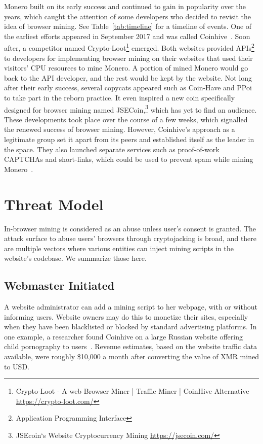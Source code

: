 Monero built on its early success and continued to gain in popularity over the years, which caught the attention of some developers who decided to revisit the idea of browser mining. See Table~\ref{tab:timeline} for a timeline of events.  One of the earliest efforts appeared in September 2017 and was called Coinhive~\cite{coinhive}. Soon after, a competitor named Crypto-Loot\footnote{Crypto-Loot - A web Browser Miner | Traffic Miner | CoinHive Alternative \url{https://crypto-loot.com/}} emerged. Both websites provided APIs\footnote{Application Programming Interface} to developers for implementing browser mining on their websites that used their visitors' CPU resources to mine Monero. A portion of mined Monero would go back to the API developer, and the rest would be kept by the website. Not long after their early success, several copycats appeared such as Coin-Have and PPoi~\cite{coinhivecopycats} to take part in the reborn practice. It even inspired a new coin specifically designed for browser mining named JSECoin,\footnote{JSEcoin`s Website Cryptocurrency Mining \url{https://jsecoin.com/}} which has yet to find an audience. These developments took place over the course of a few weeks, which signalled the renewed success of browser mining. However, Coinhive's approach as a legitimate group set it apart from its peers and established itself as the leader in the space. They also launched separate services such as proof-of-work CAPTCHAs and short-links, which could be used to prevent spam while mining Monero~\cite{coinhive}.





\section{Threat Model}
In-browser mining is considered as an abuse unless user's consent is granted. The attack surface to abuse users' browsers through cryptojacking is broad, and there are multiple vectors where various entities can inject mining scripts in the website's codebase. We summarize those here. 

\subsection{Webmaster Initiated} 

A website administrator can add a mining script to her webpage, with or without informing users. Website owners may do this to monetize their sites, especially when they have been blacklisted or blocked by standard advertising platforms. In one example, a researcher found Coinhive on a large Russian website offering child pornography to users~\cite{coinhiveonchildporn}. Revenue estimates, based on the website traffic data available, were roughly \$10,000 a month after converting the value of XMR mined to USD.

